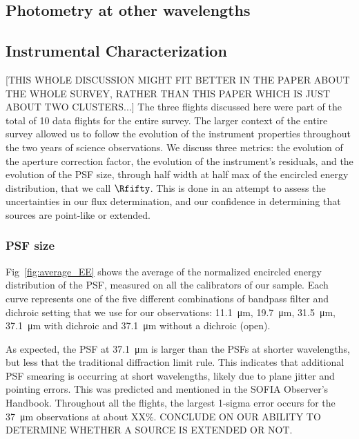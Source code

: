 \subsection{Photometry at other wavelengths}

\subsection{Instrumental Characterization}
[THIS WHOLE DISCUSSION MIGHT FIT BETTER IN THE PAPER ABOUT THE WHOLE SURVEY, RATHER THAN THIS PAPER WHICH IS JUST ABOUT TWO CLUSTERS...]
The three flights discussed here were part of the total of 10 data flights for the entire survey. The larger context of the entire survey allowed us to follow the evolution of the instrument properties throughout the two years of science observations. We discuss three metrics: the evolution of the aperture correction factor, the evolution of the instrument's residuals, and the evolution of the PSF size, through half width at half max of the encircled energy distribution, that we call $\Rfifty$. This is done in an attempt to assess the uncertainties in our flux determination, and our confidence in determining that sources are point-like or extended. %

\subsubsection{PSF size}

Fig~\ref{fig:average_EE} shows the average of the normalized encircled energy distribution of the PSF, measured on all the calibrators of our sample. Each curve represents one of the five different combinations of bandpass filter and dichroic setting that we use for our observations: \SI{11.1}{\micro\meter}, \SI{19.7}{\micro\meter}, \SI{31.5}{\micro\meter}, \SI{37.1}{\micro\meter} with dichroic and \SI{37.1}{\micro\meter} without a dichroic (open). 

As expected, the PSF at \SI{37.1}{\micro\meter} is larger than the PSFs at shorter wavelengths, but less that the traditional diffraction limit rule. This indicates that additional PSF smearing is occurring at short wavelengths, likely due to plane jitter and pointing errors. This was predicted and mentioned in the SOFIA Observer's Handbook. Throughout all the flights, the largest 1-sigma error occurs for the \SI{37}{\micro\meter} observations at about XX\%. CONCLUDE ON OUR ABILITY TO DETERMINE WHETHER A SOURCE IS EXTENDED OR NOT.

